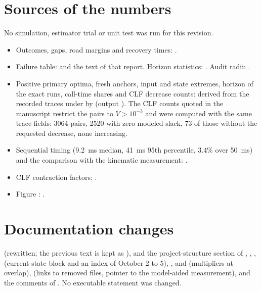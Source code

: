 \documentclass[11pt]{article}
\begin{document}
\section{Sources of the numbers}
No simulation, estimator trial or unit test was run for this revision.
\begin{itemize}
\item Outcomes, gaps, road margins and recovery times:
  .
\item Failure table:  and
  the text of that report. Horizon statistics: .
  Audit radii: .
\item Positive primary optima, fresh anchors, input and state extremes,
  horizon of the exact runs, call-time shares and CLF decrease counts:
  derived from the recorded traces under
   by
  (output ). The CLF counts quoted in the
  manuscript restrict the pairs to $V>10^{-3}$ and were computed with the same
  trace fields: 3064 pairs, 2520 with zero modeled slack, 73 of those without
  the requested decrease, none increasing.
\item Sequential timing (9.2~ms median, 41~ms 95th percentile, 3.4\% over
  50~ms) and the comparison with the kinematic measurement:
  .
\item CLF contraction factors: .
\item Figure :
  .
\end{itemize}

\section{Documentation changes}
 (rewritten; the previous text is kept as
),  and the
project-structure section of , ,
,  (current-state block and an
index of October 2 to 5), ,
 and
 (multipliers at overlap),
 (links to removed files, pointer to
the model-aided measurement), and the comments of
. No executable statement
was changed.
\end{document}
